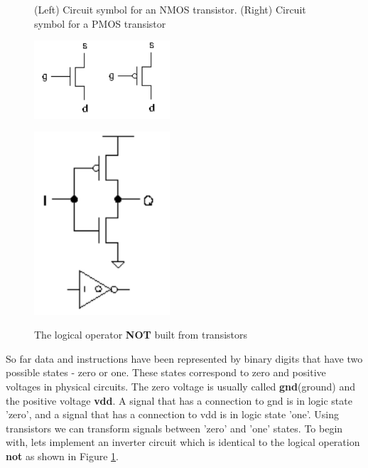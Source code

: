 \documentclass{article}
\begin{document}
	\begin{figure}[h]
	\begin{minipage}[t]{.45\textwidth}
		\caption{(Left) Circuit symbol for an NMOS transistor.  (Right) Circuit symbol for a PMOS transistor}
		\vspace{15pt}
		\centering
		\includegraphics[width=0.45\textwidth]{transistors}
		\label{fig:transistors}
	\end{minipage}
	\hfill
	\begin{minipage}[t]{.45\textwidth}
		\caption{The logical operator \textbf{NOT} built from transistors}
		\vspace{15pt}
		\centering
		\includegraphics[width=0.45\textwidth]{not_gate_transistors}
		\label{fig:not_transistors}
	\end{minipage}
	\end{figure}
	
	So far data and instructions have been represented by binary digits that have two possible states - zero or one. These states correspond to zero and positive voltages in physical circuits. The zero voltage is usually called \textbf{gnd}(ground) and the positive voltage \textbf{vdd}. A signal that has a connection to gnd is in logic state 'zero', and a signal that has a connection to vdd is in logic state 'one'. Using transistors we can transform signals between 'zero' and 'one' states. To begin with, lets implement an inverter circuit which is identical to the logical operation \textbf{not} as shown in Figure \ref{fig:not_transistors}.	
	
\end{document}

